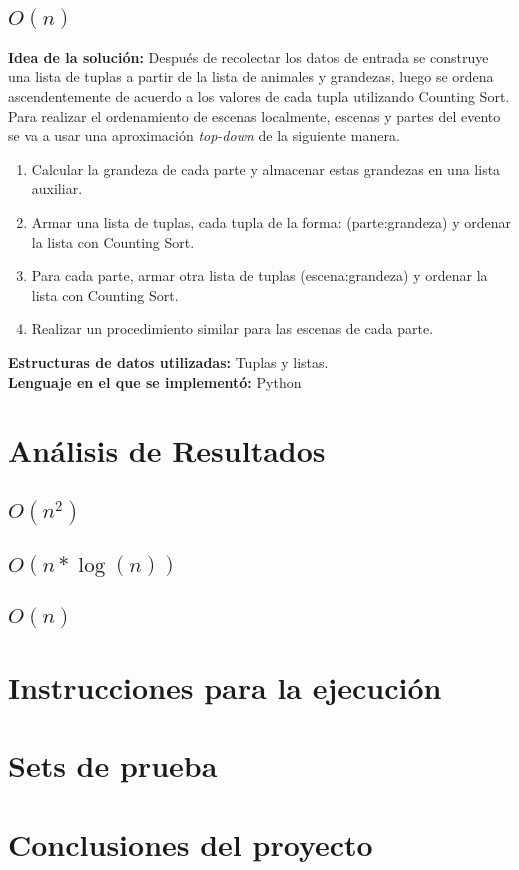 \documentclass{article}
\begin{document}
		\subsection{$O(n)$}
			\textbf{Idea de la solución:} Después de recolectar los datos de entrada se construye una lista de tuplas a partir de la
			lista de animales y grandezas, luego se ordena ascendentemente de acuerdo a los valores de cada tupla utilizando Counting Sort.
			Para realizar el ordenamiento de escenas localmente, escenas y partes del evento se va a usar una aproximación \textit{top-down}
			de la siguiente manera.
				\begin{enumerate}
					\item Calcular la grandeza de cada parte y almacenar estas grandezas en una lista auxiliar.
					\item Armar una lista de tuplas, cada tupla de la forma: (parte:grandeza) y ordenar la lista con Counting Sort.
					\item Para cada parte, armar otra lista de tuplas (escena:grandeza) y ordenar la lista con Counting Sort.
					\item Realizar un procedimiento similar para las escenas de cada parte.
				\end{enumerate}
			\textbf{Estructuras de datos utilizadas:} Tuplas y listas.\\
			\textbf{Lenguaje en el que se implementó:} Python
	\section{Análisis de Resultados}
		\subsection{$O(n^2)$}
		\subsection{$O(n*\log(n))$}
		\subsection{$O(n)$}
	\section{Instrucciones para la ejecución}

	\section{Sets de prueba}

	\section{Conclusiones del proyecto}
\end{document}
